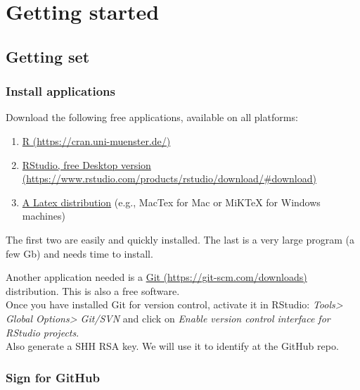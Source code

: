 \documentclass[]{book}
\providecommand{\tightlist}{%
  \setlength{\itemsep}{0pt}\setlength{\parskip}{0pt}}
\theoremstyle{definition}
\theoremstyle{definition}
\theoremstyle{definition}
\theoremstyle{remark}
\begin{document}
\hypertarget{part-getting-started}{%
\part{Getting started}\label{part-getting-started}}

\hypertarget{getset}{%
\chapter{Getting set}\label{getset}}

\hypertarget{install-applications}{%
\section{Install applications}\label{install-applications}}

Download the following free applications, available on all platforms:

\begin{enumerate}
\def\labelenumi{\arabic{enumi}.}
\tightlist
\item
  \href{https://cran.uni-muenster.de/}{R
  (https://cran.uni-muenster.de/)}
\item
  \href{https://www.rstudio.com/products/rstudio/download/\#download}{RStudio,
  free Desktop version
  (https://www.rstudio.com/products/rstudio/download/\#download)}
\item
  \href{https://www.latex-project.org/get/}{A Latex distribution} (e.g.,
  MacTex for Mac or MiKTeX for Windows machines)
\end{enumerate}

The first two are easily and quickly installed. The last is a very large
program (a few Gb) and needs time to install.

Another application needed is a \href{https://git-scm.com/downloads}{Git
(https://git-scm.com/downloads)} distribution. This is also a free
software.\\
Once you have installed Git for version control, activate it in RStudio:
\emph{Tools\textgreater{} Global Options\textgreater{} Git/SVN} and
click on \emph{Enable version control interface for RStudio projects}.\\
Also generate a SHH RSA key. We will use it to identify at the GitHub
repo.

\hypertarget{sign-for-github}{%
\section{Sign for GitHub}\label{sign-for-github}}
\end{document}

